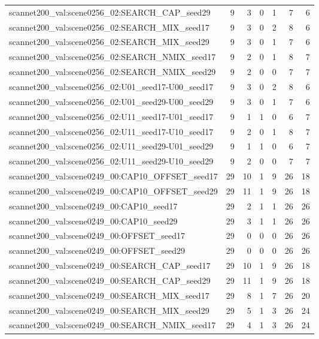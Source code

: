 \begin{table}[t]
\begin{tabular}{lrrrrrr}
scannet200\_val:scene0256\_02:SEARCH\_CAP\_seed29 & 9 & 3 & 0 & 1 & 7 & 6 \\
scannet200\_val:scene0256\_02:SEARCH\_MIX\_seed17 & 9 & 3 & 0 & 2 & 8 & 6 \\
scannet200\_val:scene0256\_02:SEARCH\_MIX\_seed29 & 9 & 3 & 0 & 1 & 7 & 6 \\
scannet200\_val:scene0256\_02:SEARCH\_NMIX\_seed17 & 9 & 2 & 0 & 1 & 8 & 7 \\
scannet200\_val:scene0256\_02:SEARCH\_NMIX\_seed29 & 9 & 2 & 0 & 0 & 7 & 7 \\
scannet200\_val:scene0256\_02:U01\_seed17-U00\_seed17 & 9 & 3 & 0 & 2 & 8 & 6 \\
scannet200\_val:scene0256\_02:U01\_seed29-U00\_seed29 & 9 & 3 & 0 & 1 & 7 & 6 \\
scannet200\_val:scene0256\_02:U11\_seed17-U01\_seed17 & 9 & 1 & 1 & 0 & 6 & 7 \\
scannet200\_val:scene0256\_02:U11\_seed17-U10\_seed17 & 9 & 2 & 0 & 1 & 8 & 7 \\
scannet200\_val:scene0256\_02:U11\_seed29-U01\_seed29 & 9 & 1 & 1 & 0 & 6 & 7 \\
scannet200\_val:scene0256\_02:U11\_seed29-U10\_seed29 & 9 & 2 & 0 & 0 & 7 & 7 \\
scannet200\_val:scene0249\_00:CAP10\_OFFSET\_seed17 & 29 & 10 & 1 & 9 & 26 & 18 \\
scannet200\_val:scene0249\_00:CAP10\_OFFSET\_seed29 & 29 & 11 & 1 & 9 & 26 & 18 \\
scannet200\_val:scene0249\_00:CAP10\_seed17 & 29 & 2 & 1 & 1 & 26 & 26 \\
scannet200\_val:scene0249\_00:CAP10\_seed29 & 29 & 3 & 1 & 1 & 26 & 26 \\
scannet200\_val:scene0249\_00:OFFSET\_seed17 & 29 & 0 & 0 & 0 & 26 & 26 \\
scannet200\_val:scene0249\_00:OFFSET\_seed29 & 29 & 0 & 0 & 0 & 26 & 26 \\
scannet200\_val:scene0249\_00:SEARCH\_CAP\_seed17 & 29 & 10 & 1 & 9 & 26 & 18 \\
scannet200\_val:scene0249\_00:SEARCH\_CAP\_seed29 & 29 & 11 & 1 & 9 & 26 & 18 \\
scannet200\_val:scene0249\_00:SEARCH\_MIX\_seed17 & 29 & 8 & 1 & 7 & 26 & 20 \\
scannet200\_val:scene0249\_00:SEARCH\_MIX\_seed29 & 29 & 5 & 1 & 3 & 26 & 24 \\
scannet200\_val:scene0249\_00:SEARCH\_NMIX\_seed17 & 29 & 4 & 1 & 3 & 26 & 24 \\

\end{tabular}
\end{table}
